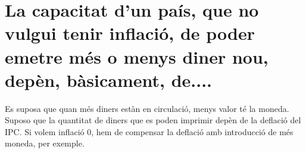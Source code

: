 \section {
  La capacitat d’un país, que no vulgui tenir inflació, de poder emetre més
  o menys diner nou, depèn, bàsicament, de....
}

Es suposa que quan més diners estàn en circulació, menys valor té la moneda.
Suposo que la quantitat de diners que es poden imprimir depèn de la 
deflació del IPC. Si volem inflació 0, hem de compensar la deflació amb
introducció de més moneda, per exemple.
